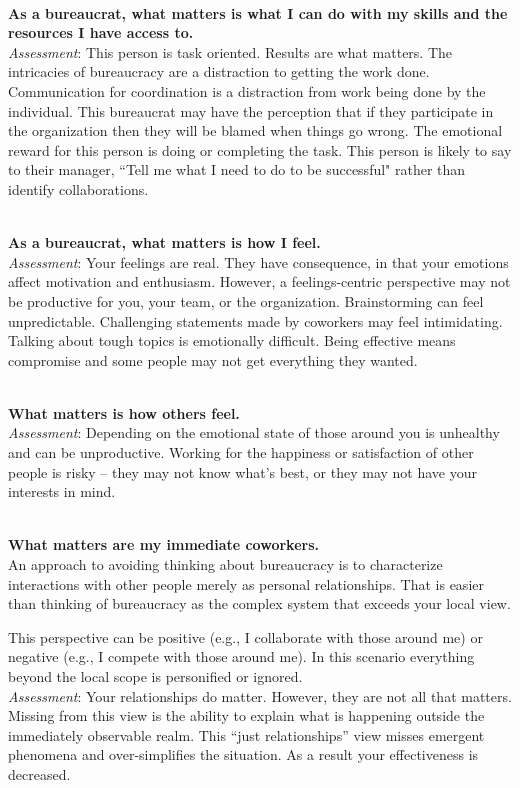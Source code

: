 \ \\
\textbf{As a bureaucrat, what matters is what I can do with my skills and the resources I have access to.} \\
\textit{Assessment}: This person is task oriented. Results are what matters. The intricacies of bureaucracy are a distraction to getting the work done. 
Communication for coordination is a distraction from work being done by the individual. 
This bureaucrat may have the perception that if they participate in the organization then they will be blamed when things go wrong.
The emotional reward for this person is doing or completing the task. This person is likely to say to their manager, ``Tell me what I need to do to be successful" rather than identify collaborations.

\ \\
\textbf{As a bureaucrat, what matters is how I feel.} \\
\textit{Assessment}: Your feelings are real. They have consequence, in that your emotions affect motivation and enthusiasm. However, a feelings-centric perspective may not be productive for you, your team, or the organization. Brainstorming can feel unpredictable. Challenging statements made by coworkers may feel intimidating. Talking about tough topics is emotionally difficult. 
Being effective means compromise and some people may not get everything they wanted. %

\ \\ 
\textbf{What matters is how others feel.}\\
\textit{Assessment}: Depending on the emotional state of those around you is unhealthy and can be unproductive. Working for the happiness or satisfaction of other people is risky -- they may not know what's best, or they may not have your interests in mind.

\ \\
\textbf{What matters are my immediate coworkers.}\\
An approach to avoiding thinking about bureaucracy is to characterize interactions with other people merely as personal relationships. That is easier than thinking of bureaucracy as the complex system that exceeds your local view.

This perspective can be positive (e.g., I collaborate with those around me) or negative (e.g., I compete with those around me).
In this scenario everything beyond the local scope is personified or ignored.  \\
\textit{Assessment}: Your relationships do matter. However, they are not all that matters. Missing from this view is the ability to explain what is happening outside the immediately observable realm. 
This ``just relationships'' view misses emergent phenomena and over-simplifies the situation. As a result your effectiveness is decreased.





